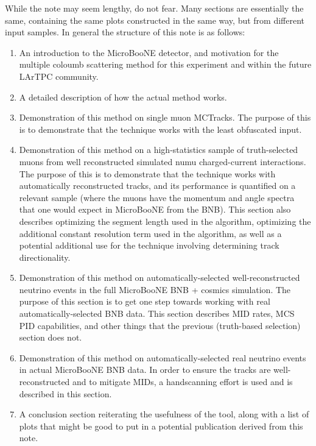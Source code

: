 \documentclass{article}
\begin{document}
While the note may seem lengthy, do not fear. Many sections are essentially the same, containing the same plots constructed in the same way, but from different input samples. In general the structure of this note is as follows:
\begin{enumerate}
\item An introduction to the MicroBooNE detector, and motivation for the multiple coloumb scattering method for this experiment and within the future LArTPC community.
\item A detailed description of how the actual method works.
\item Demonstration of this method on single muon {\sc MCTracks}. The purpose of this is to demonstrate that the technique works with the least obfuscated input.
\item Demonstration of this method on a high-statistics sample of truth-selected muons from well reconstructed simulated numu charged-current interactions. The purpose of this is to demonstrate that the technique works with automatically reconstructed tracks, and its performance is quantified on a relevant sample (where the muons have the momentum and angle spectra that one would expect in MicroBooNE from the BNB). This section also describes optimizing the segment length used in the algorithm, optimizing the additional constant resolution term used in the algorithm, as well as a potential additional use for the technique involving determining track directionality.
\item Demonstration of this method on automatically-selected well-reconstructed neutrino events in the full MicroBooNE BNB + cosmics simulation. The purpose of this section is to get one step towards working with real automatically-selected BNB data. This section describes MID rates, MCS PID capabilities, and other things that the previous (truth-based selection) section does not.
\item Demonstration of this method on automatically-selected real neutrino events in actual MicroBooNE BNB data. In order to ensure the tracks are well-reconstructed and to mitigate MIDs, a handscanning effort is used and is described in this section.
\item A conclusion section reiterating the usefulness of the tool, along with a list of plots that might be good to put in a potential publication derived from this note.
\end{enumerate}











\clearpage

\end{document}
